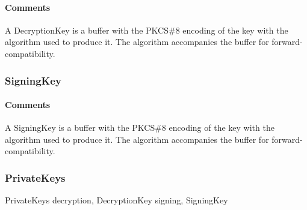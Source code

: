 \documentclass[a4paper,10pt]{article}
\begin{document}
\begin{center}
\theverbbox
\end{center}

\begin{inparaitem}[ ]
 \item \infrastructure
\end{inparaitem}

\paragraph*{Comments}
A DecryptionKey is a buffer with the PKCS\#8 encoding of the key with the algorithm used to produce it. The algorithm accompanies the buffer for forward-compatibility.

\subsubsection{SigningKey}

\begin{center}
\theverbbox
\end{center}

\begin{inparaitem}[ ]
 \item \infrastructure
\end{inparaitem}

\paragraph*{Comments}
A SigningKey is a buffer with the PKCS\#8 encoding of the key with the algorithm used to produce it. The algorithm accompanies the buffer for forward-compatibility.

\subsubsection{PrivateKeys}
\label{sec:structure:client:private_keys}

\begin{verbbox}
PrivateKeys
{
  decryption, DecryptionKey
  signing, SigningKey
}
\end{verbbox}
\begin{center}
\theverbbox
\end{center}
\end{document}

